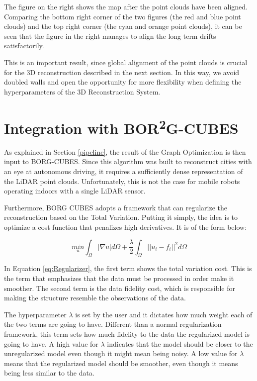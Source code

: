 \documentclass[11pt]{article}
\begin{document}
The figure on the right shows the map after the point clouds have been aligned. Comparing the bottom right corner of the two figures (the red and blue point clouds) and the top right corner (the cyan and orange point clouds), it can be seen that the figure in the right manages to align the long term drifts satisfactorily.
	
This is an important result, since global alignment of the point clouds is crucial for the 3D reconstruction described in the next section. In this way, we avoid doubled walls and open the opportunity for more flexibility when defining the hyperparameters of the 3D Reconstruction System.
	
	\newpage
	\section{Integration with BOR\textsuperscript{2}G-CUBES}
	\label{sec:Borg}
	
As explained in Section \ref{pipeline}, the result of the Graph Optimization is then input to BORG-CUBES. Since this algorithm was built to reconstruct cities with an eye at autonomous driving, it requires a sufficiently dense representation of the LiDAR point clouds. Unfortunately, this is not the case for mobile robots operating indoors with a single LiDAR sensor.
	
Furthermore, BORG CUBES adopts a framework that can regularize the reconstruction based on the Total Variation. Putting it simply, the idea is to optimize a cost function that penalizes high derivatives. It is of the form below:


\begin{equation}
\underset{u}{min} \int_{\Omega } | \nabla u| d \Omega + \frac{\lambda}{2} \int_{\Omega}||u_i - f_i||^2 d \Omega
\label{eq:Regularizer}
\end{equation}

In Equation \ref{eq:Regularizer}, the first term shows the total variation cost. This is the term that emphasizes that the data must be processed in order make it smoother. The second term is the data fidelity cost, which is responsible for making the structure resemble the observations of the data.

The hyperparameter $\lambda$ is set by the user and it dictates how much weight each of the two terms are going to have. Different than a normal regularization framework, this term sets how much fidelity to the data the regularized model is going to have. A high value for $\lambda$ indicates that the model should be closer to the unregularized model even though it might mean being noisy. A low value for $\lambda$ means that the regularized model should be smoother, even though it means being less similar to the data.
\end{document}
